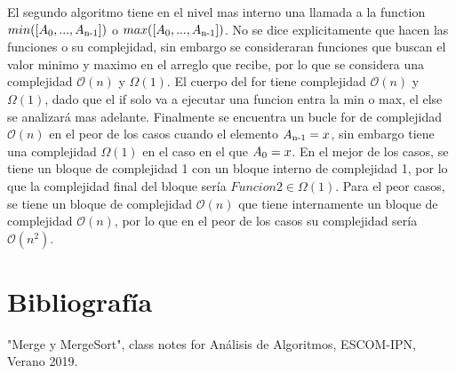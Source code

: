 \documentclass[12pt,twoside]{article}
\begin{document}
El segundo algoritmo tiene en el nivel mas interno una llamada a la function $min([A\textsubscript{0}, ..., A\textsubscript{n-1}])$ o $max([A\textsubscript{0}, ..., A\textsubscript{n-1}])$. No se dice explicitamente que hacen las funciones o su complejidad, sin embargo se consideraran funciones que buscan el valor minimo y maximo en el arreglo que recibe, por lo que se considera una complejidad $\mathcal{O}(n)$ y $\Omega (1)$. El cuerpo del for tiene complejidad $\mathcal{O}(n)$ y $\Omega (1)$, dado que el if solo va a ejecutar una funcion entra la min o max, el else se analizar\'a mas adelante. Finalmente se encuentra un bucle for de complejidad $\mathcal{O}(n)$ en el peor de los casos cuando el elemento $A\textsubscript{n-1} = x$, sin embargo tiene una complejidad $\Omega(1)$ en el caso en el que $A\textsubscript{0} = x$. En el mejor de los casos, se tiene un bloque de complejidad 1 con un bloque interno de complejidad 1, por lo que la complejidad final del bloque ser\'ia $Funcion2 \in \Omega(1)$. Para el peor casos, se tiene un bloque de complejidad $\mathcal{O}(n)$ que tiene internamente un bloque de complejidad $\mathcal{O}(n)$, por lo que en el peor de los casos su complejidad ser\'ia $\mathcal{O}(n^2)$.

\section{Bibliograf\'ia}
"Merge y MergeSort", class notes for An\'alisis de Algoritmos, ESCOM-IPN, Verano 2019.
\end{document}

